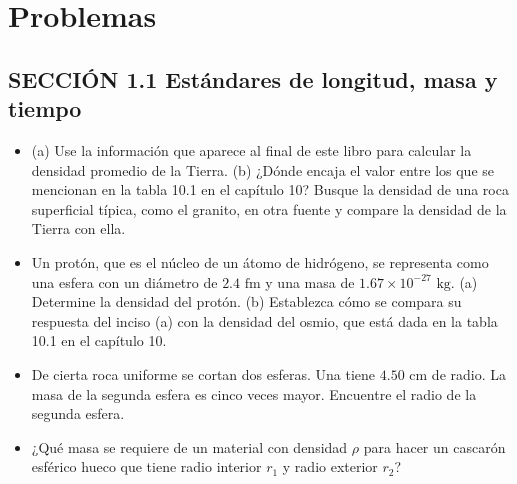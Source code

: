 \documentclass[11pt,a4paper]{article}
\begin{document}
\newpage

\section*{Problemas}

\subsection*{SECCIÓN 1.1 Estándares de longitud, masa y tiempo}

\begin{itemize}
    \item[\textbf{1.}] (a) Use la información que aparece al final de este libro para calcular la densidad promedio de la Tierra. (b) ¿Dónde encaja el valor entre los que se mencionan en la tabla 10.1 en el capítulo 10? Busque la densidad de una roca superficial típica, como el granito, en otra fuente y compare la densidad de la Tierra con ella.
    \vspace*{7cm}
    
    \item[\textbf{2.}] Un protón, que es el núcleo de un átomo de hidrógeno, se representa como una esfera con un diámetro de $2.4 \text{ fm}$ y una masa de $1.67 \times 10^{-27} \text{ kg}$. (a) Determine la densidad del protón. (b) Establezca cómo se compara su respuesta del inciso (a) con la densidad del osmio, que está dada en la tabla 10.1 en el capítulo 10.
    \vspace*{7cm}
    
    \item[\textbf{3.}] De cierta roca uniforme se cortan dos esferas. Una tiene $4.50 \text{ cm}$ de radio. La masa de la segunda esfera es cinco veces mayor. Encuentre el radio de la segunda esfera.
    \vspace*{5cm}
    
    \item[\textbf{4.}] ¿Qué masa se requiere de un material con densidad $\rho$ para hacer un cascarón esférico hueco que tiene radio interior $r_1$ y radio exterior $r_2$?
    \vspace*{4cm}
    

\end{itemize}
\end{document}
